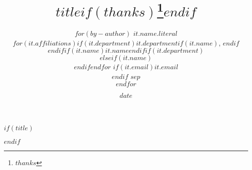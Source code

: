 $if(title)$
\title{$title$$if(thanks)$\thanks{$thanks$}$endif$}
$endif$
\author{
$for(by-author)$
$it.name.literal$\\
$for(it.affiliations)$$if(it.department)$$it.department$$if(it.name)$, $endif$\\$endif$$if(it.name)$$it.name$$endif$$if(it.department)$\\$elseif(it.name)$\\$endif$$endfor$
$if(it.email)${\tt \href{mailto:$it.email$}{$it.email$}}\\$endif$
$sep$\\\And
$endfor$}
\date{$date$}


